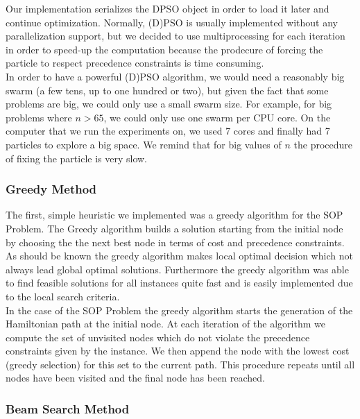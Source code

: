 \documentclass[]{article}
\begin{document}
	Our implementation serializes the DPSO object in order to load it later and continue optimization. Normally, (D)PSO is usually implemented 
	without any parallelization support, but we decided to use multiprocessing for each iteration in order to speed-up the computation because the 
	prodecure of forcing the particle to respect precedence constraints is time consuming. \\
	
	In order to have a powerful (D)PSO algorithm, we would need a reasonably big swarm (a few tens, up to one hundred or two), but given the fact 
	that some problems are big, we could only use a small swarm size. For example, for big problems where $ n > 65 $, we could only use one swarm per 
	CPU core. On the computer that we run the experiments on, we used 7 cores and finally had 7 particles to explore a big space. We remind that for 
	big values of $ n $ the procedure of fixing the particle is very slow.
	
    \subsubsection{Greedy Method}

   	The first, simple heuristic we implemented was a greedy algorithm for the SOP Problem. The Greedy algorithm builds a solution starting from the initial node by choosing the the next best node in terms of cost and precedence constraints. As should be known the greedy algorithm makes local optimal decision which not always lead global optimal solutions. Furthermore the greedy algorithm was able to find feasible solutions for all instances quite fast and is easily implemented due to the local search criteria. \cite{Cormen2009} \\

   	In the case of the SOP Problem the greedy algorithm starts the generation of the Hamiltonian path at the initial node. At each iteration of the 
   	algorithm we compute the set of unvisited nodes which do not violate the precedence constraints given by the instance. We then append the node 
   	with the lowest cost (greedy selection) for this set to the current path. This procedure repeats until all nodes have been visited and the final 
   	node has been reached.

    \subsubsection{Beam Search Method}
\end{document}
